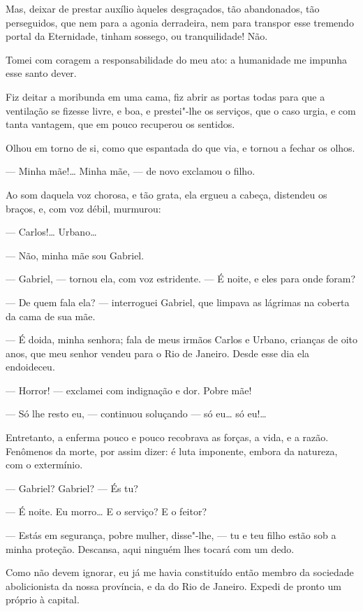 Mas, deixar de prestar auxílio àqueles desgraçados, tão abandonados, tão
perseguidos, que nem para a agonia derradeira, nem para transpor esse
tremendo portal da Eternidade, tinham sossego, ou tranquilidade! Não.

Tomei com coragem a responsabilidade do meu ato: a humanidade me impunha
esse santo dever.

Fiz deitar a moribunda em uma cama, fiz abrir as portas todas para que a
ventilação se fizesse livre, e boa, e prestei"-lhe os serviços, que o
caso urgia, e com tanta vantagem, que em pouco recuperou os sentidos.

Olhou em torno de si, como que espantada do que via, e tornou a fechar
os olhos.

--- Minha mãe!\ldots{} Minha mãe, --- de novo exclamou o filho.

Ao som daquela voz chorosa, e tão grata, ela ergueu a cabeça, distendeu
os braços, e, com voz débil, murmurou:

--- Carlos!\ldots{} Urbano\ldots{}

--- Não, minha mãe sou Gabriel.

--- Gabriel, --- tornou ela, com voz estridente. --- É noite, e eles para
onde foram?

--- De quem fala ela? --- interroguei Gabriel, que limpava as lágrimas na
coberta da cama de sua mãe.

--- É doida, minha senhora; fala de meus irmãos Carlos e Urbano,
crianças de oito anos, que meu senhor vendeu para o Rio de Janeiro.
Desde esse dia ela endoideceu.

--- Horror! --- exclamei com indignação e dor. Pobre mãe!

--- Só lhe resto eu, --- continuou soluçando --- só eu\ldots{} só eu!\ldots{}

Entretanto, a enferma pouco e pouco recobrava as forças, a vida, e a
razão. Fenômenos da morte, por assim dizer: é luta imponente, embora da
natureza, com o extermínio.

--- Gabriel? Gabriel? --- És tu?

--- É noite. Eu morro\ldots{} E o serviço? E o feitor?

--- Estás em segurança, pobre mulher, disse"-lhe, --- tu e teu filho estão
sob a minha proteção. Descansa, aqui ninguém lhes tocará com um dedo.

Como não devem ignorar, eu já me havia constituído então membro da
sociedade abolicionista da nossa província, e da do Rio de Janeiro.
Expedi de pronto um próprio à capital.

